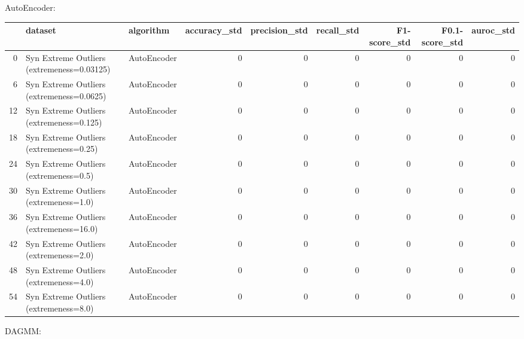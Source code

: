 AutoEncoder:

\begin{tabular}{rllrrrrrr}
\hline
    & dataset                                    & algorithm   &   accuracy\_std &   precision\_std &   recall\_std &   F1-score\_std &   F0.1-score\_std &   auroc\_std \\
\hline
  0 & Syn Extreme Outliers (extremeness=0.03125) & AutoEncoder &              0 &               0 &            0 &              0 &                0 &           0 \\
  6 & Syn Extreme Outliers (extremeness=0.0625)  & AutoEncoder &              0 &               0 &            0 &              0 &                0 &           0 \\
 12 & Syn Extreme Outliers (extremeness=0.125)   & AutoEncoder &              0 &               0 &            0 &              0 &                0 &           0 \\
 18 & Syn Extreme Outliers (extremeness=0.25)    & AutoEncoder &              0 &               0 &            0 &              0 &                0 &           0 \\
 24 & Syn Extreme Outliers (extremeness=0.5)     & AutoEncoder &              0 &               0 &            0 &              0 &                0 &           0 \\
 30 & Syn Extreme Outliers (extremeness=1.0)     & AutoEncoder &              0 &               0 &            0 &              0 &                0 &           0 \\
 36 & Syn Extreme Outliers (extremeness=16.0)    & AutoEncoder &              0 &               0 &            0 &              0 &                0 &           0 \\
 42 & Syn Extreme Outliers (extremeness=2.0)     & AutoEncoder &              0 &               0 &            0 &              0 &                0 &           0 \\
 48 & Syn Extreme Outliers (extremeness=4.0)     & AutoEncoder &              0 &               0 &            0 &              0 &                0 &           0 \\
 54 & Syn Extreme Outliers (extremeness=8.0)     & AutoEncoder &              0 &               0 &            0 &              0 &                0 &           0 \\
\hline
\end{tabular}

DAGMM:

